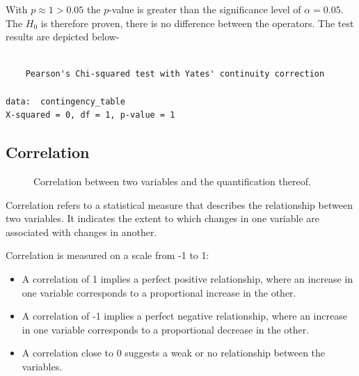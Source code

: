 \documentclass[
  a4paper,
]{scrbook}
\begin{document}
With \(p\approx1>0.05\) the \(p\)-value is greater than the significance
level of \(\alpha = 0.05\). The \(H_0\) is therefore proven, there is no
difference between the operators. The test results are depicted below-

\begin{verbatim}

    Pearson's Chi-squared test with Yates' continuity correction

data:  contingency_table
X-squared = 0, df = 1, p-value = 1
\end{verbatim}

\subsection{Correlation}\label{correlation}

\begin{figure}[ht]


\caption{\label{fig-corr}Correlation between two variables and the
quantification thereof.}

\end{figure}%

Correlation refers to a statistical measure that describes the
relationship between two variables. It indicates the extent to which
changes in one variable are associated with changes in another.

Correlation is measured on a scale from -1 to 1:

\begin{itemize}
\item
  A correlation of 1 implies a perfect positive relationship, where an
  increase in one variable corresponds to a proportional increase in the
  other.
\item
  A correlation of -1 implies a perfect negative relationship, where an
  increase in one variable corresponds to a proportional decrease in the
  other.
\item
  A correlation close to 0 suggests a weak or no relationship between
  the variables.
\end{itemize}
\end{document}
